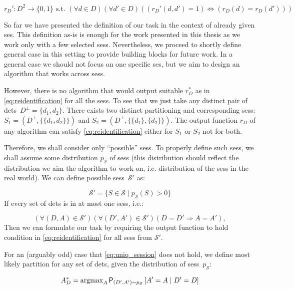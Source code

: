 $$
r_D' : D^2 \to \{0, 1\} \text{ s.t. } (\forall d \in D) (\forall d' \in D) ((r_D'(d, d') = 1) \Leftrightarrow (r_D(d) = r_D(d')))
$$

So far we have presented the definition of our task in the context of already
given \gls{ses}.
This definition as-is is enough for the work presented in this thesis as we work
only with a few selected \glspl{ses}. Nevertheless, we proceed to shortly define
general case in this setting to provide building blocks for future work.
In a general case we should not focus on one specific \gls{ses}, but
we aim to design an algorithm that works across \glspl{ses}.

However, there is no algorithm that would output suitable $r_D^*$ as in
\autoref{eq:reidentification} for all the \glspl{ses}. To see that we just take
any distinct pair of \glspl{det}~$D^\bot = \{d_1, d_2\}$. There exists two
distinct partitioning and corresponding \glspl{ses}:
$S_1 = (D^\bot, \{\{d_1, d_2\}\})$ and $S_2 = (D^\bot, \{\{d_1\}, \{d_2\}\})$.
The output function $r_D$ of any algorithm can satisfy
\autoref{eq:reidentification} either for $S_1$ or $S_2$ not for both.

Therefore, we shall consider only ``possible'' \glspl{ses}. To properly define
such \glspl{ses}, we shall assume some distribution $p_\mathcal{S}$ of
\glspl{ses} (this distribution should reflect the
distribution we aim the algorithm to work on, i.e. distribution of the
\glspl{ses} in the real world).
We can define possible \glspl{ses}~$\mathcal{S'}$ as:

$$\mathcal{S}' = \{S \in \mathcal{S} \mid p_\mathcal{S}(S) > 0\}$$
If every set of \glspl{det} is in at most one \glspl{ses}, i.e.:

\begin{equation}
    (\forall (D, A) \in \mathcal{S}')(\forall (D', A') \in \mathcal{S}') (D = D' \Rightarrow A = A'),
    \label{eq:uniq_session}
\end{equation}
Then we can formulate our task by requiring the output function to hold
condition in \autoref{eq:reidentification} for all
\glspl{ses} from $\mathcal{S}'$.

For an (arguably odd) case that \autoref{eq:uniq_session} does not hold, we
define most likely partition for any set of \glspl{det}, given the distribution
of \glspl{ses}~$p_\mathcal{S}$: 

\begin{equation}
A^*_D = \text{argmax}_A \operatorname{\textsf{P}}_{(D', A')\sim p_\mathcal{S}} \left[A' = A \mid D' = D\right]
\label{eq:mla}
\end{equation}

